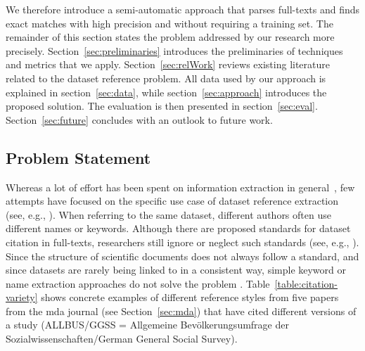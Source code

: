 \documentclass{IOS-Book-Article}
\begin{document}
We therefore introduce a semi-automatic approach that parses full-texts and finds exact matches with high precision and without requiring a training set. 
The remainder of this section states the problem addressed by our research more precisely.
Section~\ref{sec:preliminaries} introduces the preliminaries of techniques and metrics that we apply.
Section~\ref{sec:relWork} reviews existing literature related to the dataset reference problem.
All data used by our approach is explained in section~\ref{sec:data}, while section~\ref{sec:approach} introduces the proposed solution.
The evaluation is then presented in section~\ref{sec:eval}.
Section~\ref{sec:future} concludes with an outlook to future work. 
 
\subsection{Problem Statement}
Whereas a lot of effort has been spent on information extraction in general~\citep{Sarawagi2007}, few attempts have focused on the specific use case of dataset reference extraction (see, e.g., \citep{MeiyuLu2012}). 
When referring to the same dataset, different authors often use different names or keywords.
Although there are proposed standards for dataset citation in full-texts, researchers still ignore or neglect such standards (see, e.g., \cite{altman2007proposed}).
Since the structure of scientific documents does not always follow a standard, and since datasets are rarely being linked to in a consistent way,
simple keyword or name extraction approaches do not solve the problem \citep{Nadeau2007}. 
Table~\ref{table:citation-variety} shows concrete examples of different reference styles from five papers from the mda journal (see Section~\ref{sec:mda}) that have cited different versions of a study (ALLBUS/GGSS = Allgemeine Bev\"olkerungsumfrage der Sozialwissenschaften/German General Social Survey).
\end{document}
